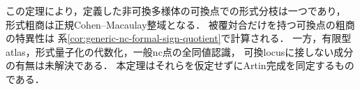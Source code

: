 \begin{remark}[局所定理と大域的な成分数]
この定理により，定義した非可換多様体の可換点での形式分枝は一つであり，
形式粗商は正規Cohen--Macaulay整域となる．
被覆対合だけを持つ可換点の粗商の特異性は
系\ref{cor:generic-nc-formal-sign-quotient}で計算される．
一方，有限型atlas，形式量子化の代数化，一般nc点の全同値認識，
可換locusに接しない成分の有無は未解決である．
本定理はそれらを仮定せずにArtin完成を同定するものである．
\end{remark}
